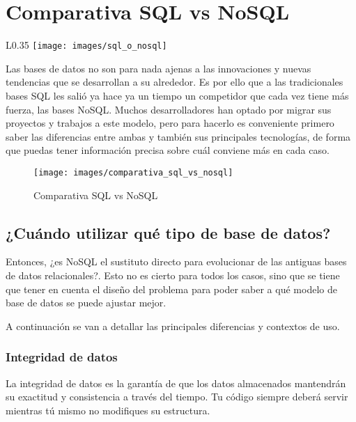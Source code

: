 \section{Comparativa SQL vs NoSQL}

\begin{wrapfigure}{L}{0.35\textwidth}
\vspace{-0.4cm}
\texttt{[image: images/sql\_o\_nosql]}
\end{wrapfigure}

Las bases de datos no son para nada ajenas a las innovaciones y nuevas tendencias que se desarrollan a su alrededor. Es por ello que a las tradicionales bases SQL les salió ya hace ya un tiempo un competidor que cada vez tiene más fuerza, las bases NoSQL. Muchos desarrolladores han optado por migrar sus proyectos y trabajos a este modelo, pero para hacerlo es conveniente primero saber las diferencias entre ambas y también sus principales tecnologías, de forma que puedas tener información precisa sobre cuál conviene más en cada caso.

\begin{figure}[H]
	\centering
	\texttt{[image: images/comparativa\_sql\_vs\_nosql]}
	\caption{Comparativa SQL vs NoSQL}
\end{figure}

\subsection*{¿Cuándo utilizar qué tipo de base de datos?}

Entonces, ¿es NoSQL el sustituto directo para evolucionar de las antiguas bases de datos relacionales?. Esto no es cierto para todos los casos, sino que se tiene que tener en cuenta el diseño del problema para poder saber a qué modelo de base de datos se puede ajustar mejor.

A continuación se van a detallar las principales diferencias y contextos de uso.

\subsubsection*{Integridad de datos}

La integridad de datos es la garantía de que los datos almacenados mantendrán su exactitud y consistencia a través del tiempo. Tu código siempre deberá servir mientras tú mismo no modifiques su estructura.

